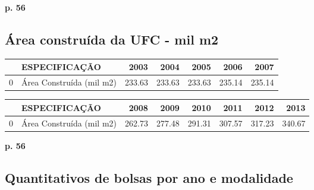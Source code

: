 \documentclass{report}
\begin{document}
\textbf{p. 56}

\subsection{Área construída da UFC - mil m2}
\begin{tabular}{llrrrrr}
\toprule
{} &             ESPECIFICAÇÃO &    2003 &    2004 &    2005 &    2006 &    2007 \\
\midrule
0 &  Área Construída (mil m2) &  233.63 &  233.63 &  233.63 &  235.14 &  235.14 \\
\bottomrule
\end{tabular}

\begin{tabular}{llrrrrrr}
\toprule
{} &             ESPECIFICAÇÃO &    2008 &    2009 &    2010 &    2011 &    2012 &    2013 \\
\midrule
0 &  Área Construída (mil m2) &  262.73 &  277.48 &  291.31 &  307.57 &  317.23 &  340.67 \\
\bottomrule
\end{tabular}
\textbf{p. 56}


\subsection{Quantitativos de bolsas por ano e modalidade}
\end{document}
